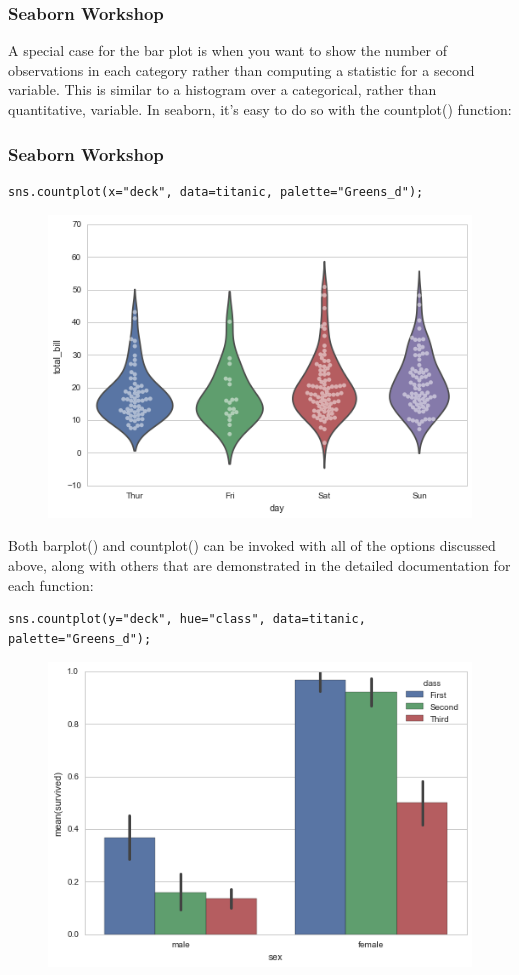 \documentclass{beamer}
\begin{document}
\begin{frame}[fragile]
	\frametitle{Seaborn Workshop}
A special case for the bar plot is when you want to show the number of observations in each category rather than computing a statistic for a second variable. This is similar to a histogram over a categorical, rather than quantitative, variable. In seaborn, it’s easy to do so with the countplot() function:
\end{frame}
\begin{frame}[fragile]
	\frametitle{Seaborn Workshop}
	\begin{verbatim}
sns.countplot(x="deck", data=titanic, palette="Greens_d");
	\end{verbatim}

\begin{figure}
\centering
\includegraphics[width=0.7\linewidth]{images/categorical_31_0}
\caption{}
\label{fig:categorical_31_0}
\end{figure}
\end{frame}
\begin{frame}[fragile]
Both barplot() and countplot() can be invoked with all of the options discussed above, along with others that are demonstrated in the detailed documentation for each function:
\begin{verbatim}
sns.countplot(y="deck", hue="class", data=titanic, palette="Greens_d");
\end{verbatim}

\begin{figure}
\centering
\includegraphics[width=0.7\linewidth]{images/categorical_33_0}
\caption{}
\label{fig:categorical_33_0}
\end{figure}

\end{frame}
\end{document}
